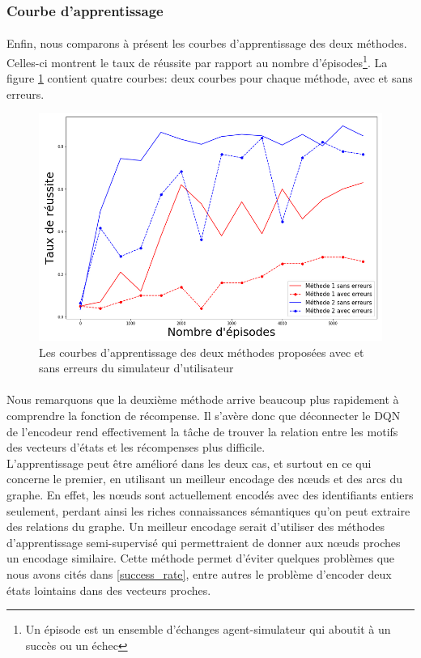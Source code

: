 \subsubsection{Courbe d'apprentissage}
\paragraph{}Enfin, nous comparons à présent les courbes d'apprentissage des deux méthodes. Celles-ci montrent le taux de réussite par rapport au nombre d'épisodes\footnote{Un épisode est un ensemble d'échanges agent-simulateur qui aboutit à un succès ou un échec}. La figure \ref{courbes} contient quatre courbes: deux courbes pour chaque méthode, avec et sans erreurs.
\begin{figure}[H] 
	\centering
	\includegraphics[width=0.95\linewidth]{images/Realisation/DM/courbes.png}
	\caption{Les courbes d'apprentissage des deux méthodes proposées avec et sans erreurs du simulateur d'utilisateur}\label{courbes}
\end{figure}
\paragraph{}Nous remarquons que la deuxième méthode arrive beaucoup plus rapidement à comprendre la fonction de récompense. Il s'avère donc que déconnecter le DQN de l'encodeur rend effectivement la tâche de trouver la relation entre les motifs des vecteurs d'états et les récompenses plus difficile.\\[6pt]
L'apprentissage peut être amélioré dans les deux cas, et surtout en ce qui concerne le premier, en utilisant un meilleur encodage des n\oe{}uds et des arcs du graphe. En effet, les n\oe{}uds sont actuellement encodés avec des identifiants entiers seulement, perdant ainsi les riches connaissances sémantiques qu'on peut extraire des relations du graphe. Un meilleur encodage serait d'utiliser des méthodes d'apprentissage semi-supervisé qui permettraient de donner aux n\oe{}uds proches un encodage similaire. Cette méthode permet d'éviter quelques problèmes que nous avons cités dans \ref{success_rate}, entre autres le problème d'encoder deux états lointains dans des vecteurs proches.

